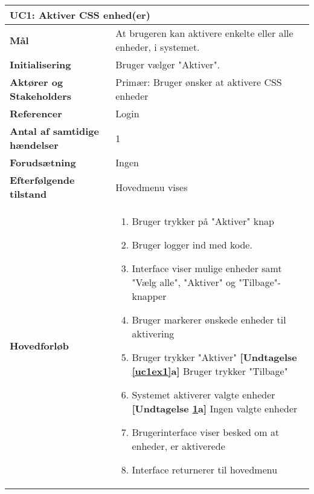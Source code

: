 \begin{table}[H] \centering
	\begin{tabular} {|p{6cm}|p{8cm}|}
	\hline
		\multicolumn{2}{|l|}{\textbf{UC1: Aktiver CSS enhed(er)}} \\\hline
		
		\textbf{Mål}							&At brugeren kan aktivere enkelte eller alle enheder, i systemet.	\\\hline
		\textbf{Initialisering}				&Bruger vælger "Aktiver". 										\\\hline
		\textbf{Aktører og Stakeholders}		&Primær: Bruger ønsker at aktivere CSS enheder					\\\hline
		\textbf{Referencer}					&Login															\\\hline
		\textbf{Antal af samtidige hændelser}&1 																\\\hline
		\textbf{Forudsætning}				&Ingen															\\\hline
		\textbf{Efterfølgende tilstand}		&Hovedmenu vises 												\\\hline
		\textbf{Hovedforløb}					
			&\begin{enumerate}
	
				\item Bruger trykker på "Aktiver" knap
				
				\item Bruger logger ind med kode.
										
				\item Interface viser mulige enheder samt "Vælg alle", "Aktiver" og "Tilbage"-knapper
												
				\item \label{uc1select} Bruger markerer ønskede enheder til aktivering
												
				\item \label{uc1ex1} Bruger trykker "Aktiver"\newline
					\textbf{[Undtagelse \ref{uc1ex1}a]} Bruger trykker "Tilbage"
												
				\item \label{uc1ex2} Systemet aktiverer valgte enheder\newline
					\textbf{[Undtagelse \ref{uc1ex2}a]} Ingen valgte enheder
				
				\item Brugerinterface viser besked om at enheder, er aktiverede
																	
				\item Interface returnerer til hovedmenu
												

\end{enumerate}
\end{tabular}
\end{table}
